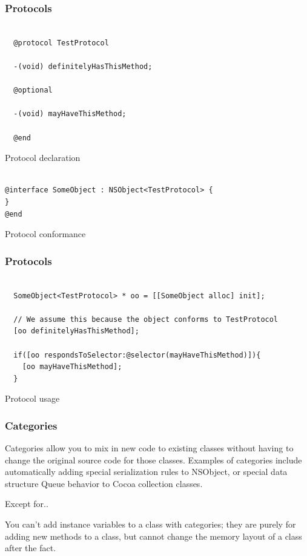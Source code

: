 \documentclass[10pt]{beamer}
\begin{document}
\begin{frame}[fragile]
  \frametitle{Protocols}
  \begin{listing}[H]
    \begin{verbatim}

  @protocol TestProtocol

  -(void) definitelyHasThisMethod;

  @optional

  -(void) mayHaveThisMethod;

  @end

  \end{verbatim}
    \caption{Protocol declaration}
    \label{listing:15}
  \end{listing}
\begin{listing}[H]
  \begin{verbatim}

@interface SomeObject : NSObject<TestProtocol> {
}
@end 
\end{verbatim}
  \caption{Protocol conformance}
  \label{listing:16}
\end{listing}

\end{frame}

\begin{frame}[fragile]
  \frametitle{Protocols}
  \begin{listing}[H]
    \begin{verbatim}

  SomeObject<TestProtocol> * oo = [[SomeObject alloc] init];

  // We assume this because the object conforms to TestProtocol              
  [oo definitelyHasThisMethod];

  if([oo respondsToSelector:@selector(mayHaveThisMethod)]){
    [oo mayHaveThisMethod];
  }

  \end{verbatim}
    \caption{Protocol usage}
    \label{listing:17}
  \end{listing}

\end{frame}

    
\begin{frame}[fragile]
  \frametitle{Categories}
  Categories allow you to mix in new code to existing classes without having to change the original source code for those classes.  Examples of categories include automatically adding special serialization rules to NSObject, or special data structure Queue behavior to Cocoa collection classes.
\begin{alertblock}{Except for..}

  You can't add instance variables to a class with categories; they are
  purely for adding new methods to a class, but cannot change the memory
  layout of a class after the fact.

  \end{alertblock}

\end{frame}
\end{document}
